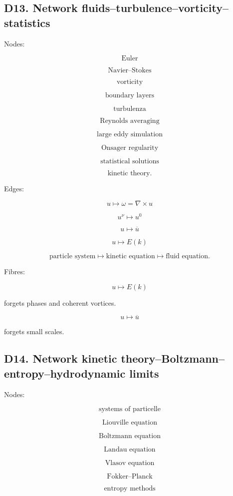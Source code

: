 \documentclass[11pt]{article}
\begin{document}
\subsection{D13. Network fluids--turbulence--vorticity--statistics}

Nodes:

\[
\text{Euler}
\]

\[
\text{Navier--Stokes}
\]

\[
\text{vorticity}
\]

\[
\text{boundary layers}
\]

\[
\text{turbulenza}
\]

\[
\text{Reynolds averaging}
\]

\[
\text{large eddy simulation}
\]

\[
\text{Onsager regularity}
\]

\[
\text{statistical solutions}
\]

\[
\text{kinetic theory}.
\]

Edges:

\[
u\mapsto \omega=\nabla\times u
\]

\[
u^\nu\mapsto u^0
\]

\[
u\mapsto \overline u
\]

\[
u\mapsto E(k)
\]

\[
\text{particle system}\mapsto \text{kinetic equation}\mapsto \text{fluid equation}.
\]

Fibres:

\[
u\mapsto E(k)
\]

forgets phases and coherent vortices.

\[
u\mapsto \overline u
\]

forgets small scales.



\subsection{D14. Network kinetic theory--Boltzmann--entropy--hydrodynamic limits}

Nodes:

\[
\text{systems of particelle}
\]

\[
\text{Liouville equation}
\]

\[
\text{Boltzmann equation}
\]

\[
\text{Landau equation}
\]

\[
\text{Vlasov equation}
\]

\[
\text{Fokker--Planck}
\]

\[
\text{entropy methods}
\]
\end{document}
